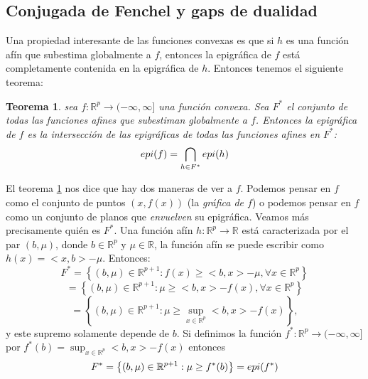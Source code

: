 \documentclass[12pt,draftcls, onecolumn, letterpaper,compsoc]{IEEEtran}
\newtheorem{theorem}{\textbf{Teorema}}
\begin{document}
\subsection{Conjugada de Fenchel y gaps de dualidad}

Una propiedad interesante de las funciones convexas es que si $h$ es una funci\'{o}n af\'{i}n que subestima globalmente a $f$, entonces la epigr\'{a}fica de $f$ est\'{a} completamente contenida en la epigr\'{a}fica de $h$. Entonces tenemos el siguiente teorema:\\

\begin{theorem}\label{th:epi_intersection}
    sea $f:\mathbb{R}^{p}\rightarrow (-\infty, \infty]$ una funci\'{o}n convexa. Sea $F^{*}$ el conjunto de todas las funciones afines que subestiman globalmente a $f$. Entonces la epigr\'{a}fica de $f$ es la intersecci\'{o}n de las epigr\'{a}ficas de todas las funciones afines en $F^{*}$:
    \begin{equation}
        epi(f) = \bigcap_{h\in F^{*}} epi(h)\\
    \end{equation}
\end{theorem}

El teorema \ref{th:epi_intersection} nos dice que hay dos maneras de ver a $f$. Podemos pensar en $f$ como el conjunto de puntos $(x, f(x))$ (la {\it gr\'{a}fica de $f$}) o podemos pensar en $f$ como un conjunto de planos que {\it envuelven}  su epigr\'{a}fica. Veamos m\'{a}s precisamente qui\'{e}n es $F^{*}$. Una funci\'{o}n af\'{i}n $h:\mathbb{R}^{p} \rightarrow \mathbb{R}$ est\'{a} caracterizada por el par $(b, \mu)$, donde $b\in \mathbb{R}^{p}$ y $\mu \in \mathbb{R}$, la funci\'{o}n af\'{i}n se puede escribir como $h(x) = <x, b> - \mu$. Entonces:\\

\begin{displaymath}
    F^{*} = \left\lbrace (b, \mu) \in \mathbb{R}^{p+1} : f(x) \geq <b, x> -\mu, \forall x \in \mathbb{R}^{p}\right\rbrace
\end{displaymath}
\begin{displaymath}
    = \left\lbrace (b, \mu) \in \mathbb{R}^{p+1} : \mu \geq <b, x> - f(x), \forall x \in \mathbb{R}^{p}\right\rbrace
\end{displaymath}
\begin{displaymath}
    = \left\lbrace (b, \mu) \in \mathbb{R}^{p+1} : \mu \geq \sup_{x\in\mathbb{R}^{p}} <b, x> - f(x) \right\rbrace,
\end{displaymath}
y este supremo solamente depende de $b$. Si definimos la funci\'{o}n $f^{*}:\mathbb{R}^{p} \rightarrow (-\infty, \infty]$ por $f^{*}(b) = \sup_{x\in\mathbb{R}^{p}}<b, x> - f(x)$ entonces\\
\begin{displaymath}
    F^{*} = \left\lbrace (b, \mu) \in \mathbb{R}^{p+1} : \mu \geq f^{*}(b) \right\rbrace = epi(f^{*})\\
\end{displaymath}
\end{document}
